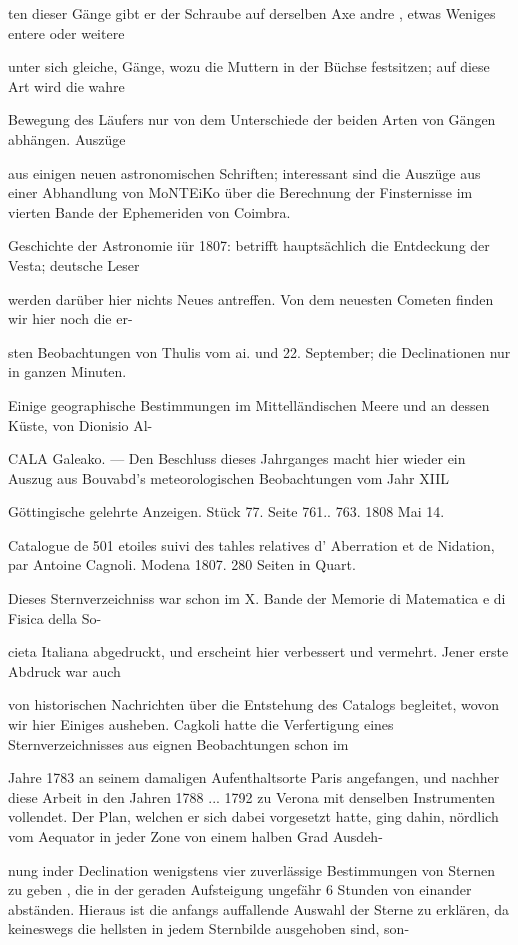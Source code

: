 \documentclass[10pt,a4paper]{article}
\begin{document}
ten dieser Gänge gibt er der Schraube auf derselben Axe andre , etwas Weniges entere oder weitere

unter sich gleiche, Gänge, wozu die Muttern in der Büchse festsitzen; auf diese Art wird die wahre

Bewegung des Läufers nur von dem Unterschiede der beiden Arten von Gängen abhängen. Auszüge

aus einigen neuen astronomischen Schriften; interessant sind die Auszüge aus einer Abhandlung von MoNTEiKo über die Berechnung der Finsternisse im vierten Bande der Ephemeriden von Coimbra.

Geschichte der Astronomie iür 1807: betrifft hauptsächlich die Entdeckung der Vesta; deutsche Leser

werden darüber hier nichts Neues antreffen. Von dem neuesten Cometen finden wir hier noch die er-

sten Beobachtungen von Thulis vom ai. und 22. September; die Declinationen nur in ganzen Minuten.

Einige geographische Bestimmungen im Mittelländischen Meere und an dessen Küste, von Dionisio Al-

CALA Galeako. — Den Beschluss dieses Jahrganges macht hier wieder ein Auszug aus Bouvabd's meteorologischen Beobachtungen vom Jahr XIIL

Göttingische gelehrte Anzeigen. Stück 77. Seite 761.. 763. 1808 Mai 14.

Catalogue de 501 etoiles suivi des tahles relatives d' Aberration et de Nidation, par Antoine Cagnoli. Modena 1807. 280 Seiten in Quart.

Dieses Sternverzeichniss war schon im X. Bande der Memorie di Matematica e di Fisica della So-

cieta Italiana abgedruckt, und erscheint hier verbessert und vermehrt. Jener erste Abdruck war auch

von historischen Nachrichten über die Entstehung des Catalogs begleitet, wovon wir hier Einiges ausheben. Cagkoli hatte die Verfertigung eines Sternverzeichnisses aus eignen Beobachtungen schon im

Jahre 1783 an seinem damaligen Aufenthaltsorte Paris angefangen, und nachher diese Arbeit in den Jahren 1788 ... 1792 zu Verona mit denselben Instrumenten vollendet. Der Plan, welchen er sich dabei vorgesetzt hatte, ging dahin, nördlich vom Aequator in jeder Zone von einem halben Grad Ausdeh-

nung inder Declination wenigstens vier zuverlässige Bestimmungen von Sternen zu geben , die in der geraden Aufsteigung ungefähr 6 Stunden von einander abständen. Hieraus ist die anfangs auffallende Auswahl der Sterne zu erklären, da keineswegs die hellsten in jedem Sternbilde ausgehoben sind, son-
\end{document}
